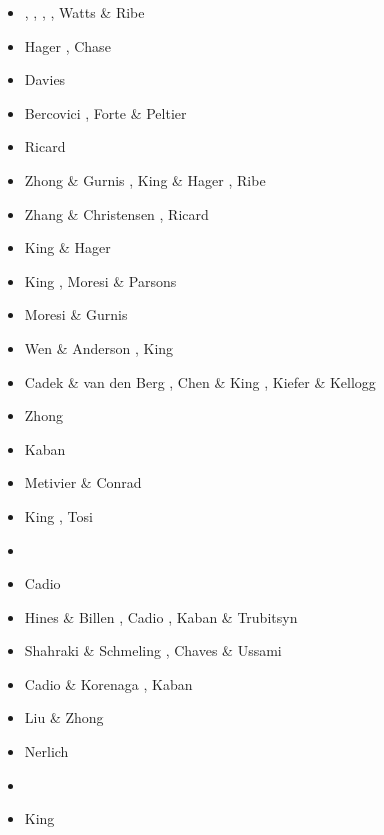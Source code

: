 \begin{scriptsize}
\begin{itemize}
\item[\nineteeneightyfour] \cite{davi84}, \cite{hage84},
                           \cite{riff84}, \cite{riha84},
                           Watts \& Ribe \cite{wari84}
\item[\nineteeneightyfive] Hager \etal \cite{hacr85}, Chase \cite{chas85}
\item[\nineteeneightysix] Davies \cite{davi86}
\item[\nineteeneightyeight] Bercovici \etal \cite{besz88}, Forte \& Peltier \cite{fope88}
\item[\nineteeneightynine] Ricard \etal \cite{rivf89}
\item[\nineteenninetytwo] Zhong \& Gurnis \cite{zhgu92}, King \& Hager \cite{kiha92}, 
                          Ribe \cite{ribe92}
\item[\nineteenninetythree] Zhang \& Christensen \cite{zhch93}, Ricard \etal \cite{rirl93}
\item[\nineteenninetyfour] King \& Hager \cite{kiha94}
\item[\nineteenninetyfive] King \cite{king95}, Moresi \& Parsons \cite{mopa95}
\item[\nineteenninetysix] Moresi \& Gurnis \cite{mogu96}
\item[\nineteenninetyseven] Wen \& Anderson \cite{wean97a}, King \cite{king97} 
\item[\nineteenninetyeight] Cadek \& van den Berg \cite{cava98}, Chen \& King \cite{chki98},
                            Kiefer \& Kellogg \cite{kike98}
\item[\twothousandone] Zhong \cite{zhon01}
\item[\twothousandseven] Kaban \etal \cite{kart07}
\item[\twothousandeight] Metivier \& Conrad \cite{meco08}
\item[\twothousandnine] King \cite{king09}, Tosi \etal \cite{tocm09}
\item[\twothousandten] \cite{ghbz10}\cite{spgs10b}
\item[\twothousandeleven] Cadio \etal \cite{capd11}
\item[\twothousandtwelve] Hines \& Billen \cite{hibi12}, Cadio \etal \cite{cabp12}, 
                          Kaban \& Trubitsyn \cite{katr12}
\item[\twothousandthirteen] Shahraki \& Schmeling \cite{shsc13}, Chaves \& Ussami \cite{chus13}
\item[\twothousandfourteen] Cadio \& Korenaga \cite{cako14}, Kaban \etal \cite{kaps14}
\item[\twothousandfifteen] Liu \& Zhong \cite{lizh15}
\item[\twothousandsixteen] Nerlich \etal \cite{necg16}
\item[\twothousandseventeen] \cite{grab17}\\
\item[\twothousandeighteen] King \cite{king18}
\end{itemize}
\end{scriptsize}

